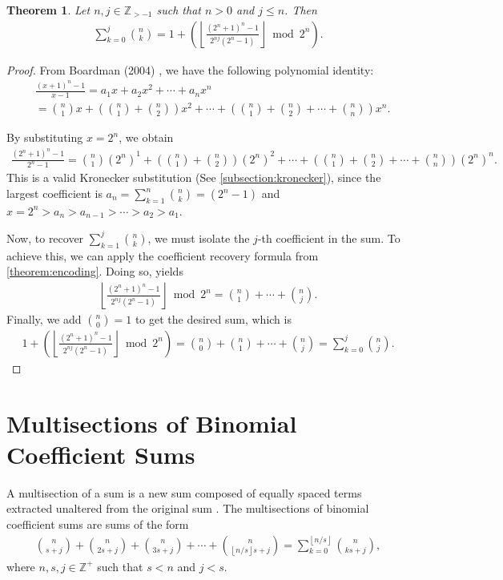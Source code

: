 \documentclass[10pt]{article}
\theoremstyle{plain}
\newtheorem{theorem}{Theorem}[section]
\newcommand{\floor}[1]{\left\lfloor #1 \right\rfloor}
\newcommand{\Z}{\mathbb{Z}}
\begin{document}
\begin{theorem} \label{proof:binomialcoeffpartialsums2}
Let $n,j \in \Z_{>-1}$ such that $n>0$ and $j \leq n$. Then
\begin{align*}
\sum_{k=0}^{j} \binom{n}{k} = 1 + \left( \floor{ \frac{(2^n+1)^n - 1}{2^{nj}(2^n-1)} } \bmod 2^n \right) .
\end{align*}
\end{theorem}
\begin{proof}
From Boardman (2004) \cite{boardman2004eggdropnumbers}, we have the following polynomial identity:
\begin{align*}
& \frac{(x+1)^n - 1}{x-1} = a_1 x + a_2 x^2 + \cdots + a_n x^n \\
&= \binom{n}{1} x
+ \left( \binom{n}{1} + \binom{n}{2} \right) x^2
+ \cdots
+ \left( \binom{n}{1} + \binom{n}{2} + \cdots + \binom{n}{n} \right) x^n .
\end{align*}

By substituting $x=2^n$, we obtain
\begin{align*}
\frac{(2^n+1)^n - 1}{2^n-1} = 
\binom{n}{1} (2^n)^1
+ \left( \binom{n}{1} + \binom{n}{2} \right) (2^n)^2
+ \cdots
+ \left( \binom{n}{1} + \binom{n}{2} + \cdots + \binom{n}{n} \right) (2^n)^n .
\end{align*}
This is a valid Kronecker substitution (See \cref{subsection:kronecker}), since the largest coefficient is $a_n = \sum_{k=1}^n \binom{n}{k} = (2^n-1)$ and $x=2^n > a_n > a_{n-1} > \cdots > a_2 > a_1$.

Now, to recover $\sum_{k=1}^j \binom{n}{k}$, we must isolate the $j$-th coefficient in the sum. To achieve this, we can apply the coefficient recovery formula from \cref{theorem:encoding}. Doing so, yields
\begin{align*}
\floor{ \frac{(2^n+1)^n - 1}{2^{nj}(2^n-1)} } \bmod 2^n = 
\binom{n}{1} + \cdots + \binom{n}{j} .
\end{align*}
Finally, we add $\binom{n}{0} = 1$ to get the desired sum, which is
\begin{align*}
1 + \left( \floor{ \frac{(2^n+1)^n - 1}{2^{nj}(2^n-1)} } \bmod 2^n \right) = 
\binom{n}{0} + \binom{n}{1} + \cdots + \binom{n}{j} = \sum_{k=0}^j \binom{n}{j} .
\end{align*}
\end{proof}

\section{Multisections of Binomial Coefficient Sums} \label{section:multisectionsums}
A multisection of a sum is a new sum composed of equally spaced terms extracted unaltered from the original sum \cite{wikipedia2024seriesmultisection}. The multisections of binomial coefficient sums are sums of the form
\begin{align*}
\binom{n}{s+j} + \binom{n}{2s+j} + \binom{n}{3s+j} + \cdots + \binom{n}{\floor{n/s}s+j}
= \sum_{k=0}^{\floor{n/s}} \binom{n}{ks+j} ,
\end{align*}
where $n,s,j \in \Z^+$ such that $s < n$ and $j < s$.
\end{document}
